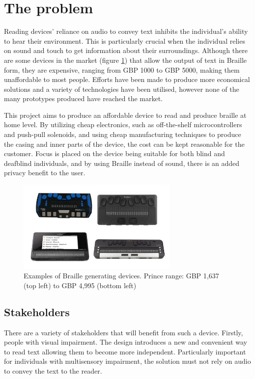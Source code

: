 \section{The problem}
Reading devices' reliance on audio to convey text inhibits the individual's ability to hear their environment.
This is particularly crucial when the individual relies on sound and touch to get information about their surroundings.
Although there are some devices in the market (figure \ref{fig:braille-readers-examples}) that allow the output of text in Braille form, they are expensive, ranging from GBP 1000 to GBP 5000, making them unaffordable to most people.
Efforts have been made to produce more economical solutions and a variety of technologies have been utilised, however none of the many prototypes produced have reached the market.

This project aims to produce an affordable device to read and produce braille at home level.
By utilizing cheap electronics, such as off-the-shelf microcontrollers and push-pull solenoids, and using cheap manufacturing techniques to produce the casing and inner parts of the device, the cost can be kept reasonable for the customer.
Focus is placed on the device being suitable for both blind and deafblind individuals, and by using Braille instead of sound, there is an added privacy benefit to the user.
\begin{figure}[h]
\centering
    \includegraphics[width=0.7\textwidth]{figures/braille-readers-examples.jpg}
\caption[Examples of Braille generating devices]{Examples of Braille generating devices. Prince range: GBP 1,637 (top left) to GBP 4,995 (bottom left)}
\label{fig:braille-readers-examples}
\end{figure}

\subsection{Stakeholders}
There are a variety of stakeholders that will benefit from such a device.
Firstly, people with visual impairment.
The design introduces a new and convenient way to read text allowing them to become more independent.
Particularly important for individuals with multisensory impairment, the solution must not rely on audio to convey the text to the reader.

